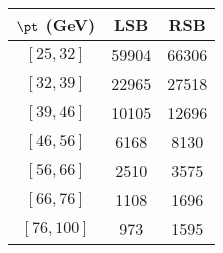 \begin{tabular}{c||c|c}
$\pt$ (GeV) & LSB & RSB  \\
\hline
$[25, 32]$ & 59904 & 66306\\
$[32, 39]$ & 22965 & 27518\\
$[39, 46]$ & 10105 & 12696\\
$[46, 56]$ & 6168 & 8130\\
$[56, 66]$ & 2510 & 3575\\
$[66, 76]$ & 1108 & 1696\\
$[76, 100]$ & 973 & 1595\\
\end{tabular}
